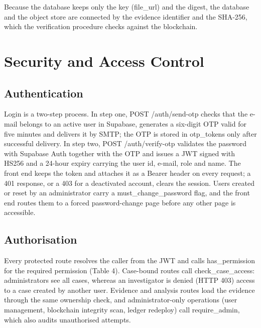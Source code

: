 \documentclass[12pt,a4paper,oneside]{report}
\newcommand{\code}[1]{{\small\ttfamily #1}}
\begin{document}
Because the database keeps only the key (\code{file\_\allowbreak{}url}) and the digest, the database and the object store are connected by the evidence identifier and the SHA-256, which the verification procedure checks against the blockchain.

\section{Security and Access Control}
\subsection{Authentication}
Login is a two-step process. In step one, \code{POST /\allowbreak{}auth/\allowbreak{}send-otp} checks that the e-mail belongs to an active user in Supabase, generates a six-digit OTP valid for five minutes and delivers it by SMTP; the OTP is stored in \code{otp\_\allowbreak{}tokens} only after successful delivery. In step two, \code{POST /\allowbreak{}auth/\allowbreak{}verify-otp} validates the password with Supabase Auth together with the OTP and issues a JWT signed with HS256 and a 24-hour expiry carrying the user id, e-mail, role and name. The front end keeps the token and attaches it as a Bearer header on every request; a 401 response, or a 403 for a deactivated account, clears the session. Users created or reset by an administrator carry a \code{must\_\allowbreak{}change\_\allowbreak{}password} flag, and the front end routes them to a forced password-change page before any other page is accessible.

\subsection{Authorisation}
Every protected route resolves the caller from the JWT and calls \code{has\_\allowbreak{}permission} for the required permission (Table 4). Case-bound routes call \code{check\_\allowbreak{}case\_\allowbreak{}access}: administrators see all cases, whereas an investigator is denied (HTTP 403) access to a case created by another user. Evidence and analysis routes load the evidence through the same ownership check, and administrator-only operations (user management, blockchain integrity scan, ledger redeploy) call \code{require\_\allowbreak{}admin}, which also audits unauthorised attempts.
\end{document}
